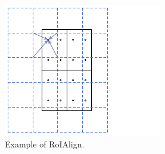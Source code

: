 \begin{figure}[!h]
	\centering
	\includegraphics[width=\figfig\textwidth,angle=90]{3-18.pdf}
    \caption[Example of RoIAlign]{Example of RoIAlign.}
    \label{fig:roialg}
\end{figure}